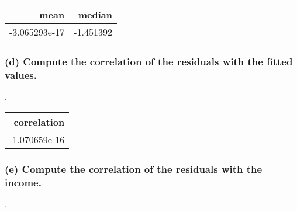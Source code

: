 \documentclass[
]{article}
\newenvironment{Shaded}{\begin{snugshade}}{\end{snugshade}}
\newcommand{\DataTypeTok}[1]{\textcolor[rgb]{0.13,0.29,0.53}{#1}}
\newcommand{\KeywordTok}[1]{\textcolor[rgb]{0.13,0.29,0.53}{\textbf{#1}}}
\newcommand{\NormalTok}[1]{#1}
\newcommand{\OperatorTok}[1]{\textcolor[rgb]{0.81,0.36,0.00}{\textbf{#1}}}
\newcommand{\StringTok}[1]{\textcolor[rgb]{0.31,0.60,0.02}{#1}}
\begin{document}
\captionsetup[table]{labelformat=empty,skip=1pt}
\begin{longtable}{rr}
\toprule
mean & median \\ 
\midrule
-3.065293e-17 & -1.451392 \\ 
\bottomrule
\end{longtable}

\hypertarget{d-compute-the-correlation-of-the-residuals-with-the-fitted-values.}{%
\subsubsection{(d) Compute the correlation of the residuals with the
fitted
values.}\label{d-compute-the-correlation-of-the-residuals-with-the-fitted-values.}}

.

\begin{Shaded}
\end{Shaded}

\captionsetup[table]{labelformat=empty,skip=1pt}
\begin{longtable}{r}
\toprule
correlation \\ 
\midrule
-1.070659e-16 \\ 
\bottomrule
\end{longtable}

\hypertarget{e-compute-the-correlation-of-the-residuals-with-the-income.}{%
\subsubsection{(e) Compute the correlation of the residuals with the
income.}\label{e-compute-the-correlation-of-the-residuals-with-the-income.}}

.

\begin{Shaded}
\end{Shaded}
\end{document}
